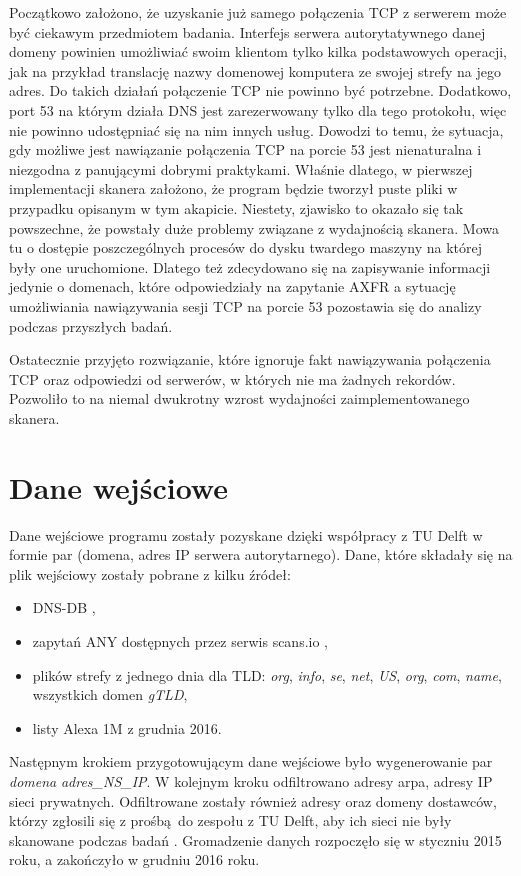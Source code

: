 Początkowo założono, że uzyskanie już samego połączenia TCP z serwerem może być ciekawym przedmiotem badania. Interfejs serwera
autorytatywnego danej domeny powinien umożliwiać swoim klientom tylko kilka podstawowych operacji, jak na przykład translację nazwy
domenowej komputera ze swojej strefy na jego adres. Do takich działań połączenie TCP nie powinno być potrzebne. Dodatkowo, port 53 na którym działa
DNS jest zarezerwowany tylko dla tego protokołu, więc nie powinno udostępniać się na nim innych usług. Dowodzi to temu, że sytuacja,
gdy możliwe jest nawiązanie połączenia TCP na porcie 53 jest nienaturalna i niezgodna z panującymi dobrymi praktykami. Właśnie dlatego,
w pierwszej implementacji skanera założono, że program będzie tworzył puste pliki w przypadku opisanym w tym akapicie. Niestety,
zjawisko to okazało się tak powszechne, że powstały duże problemy związane z wydajnością skanera. Mowa tu o dostępie poszczególnych
procesów do dysku twardego maszyny na której były one uruchomione. Dlatego też zdecydowano się na zapisywanie informacji jedynie o
domenach, które odpowiedziały na zapytanie AXFR a sytuację umożliwiania nawiązywania sesji TCP na porcie 53 pozostawia się do analizy
podczas przyszłych badań.

Ostatecznie przyjęto rozwiązanie, które ignoruje fakt nawiązywania połączenia TCP oraz odpowiedzi od serwerów, w których nie ma
żadnych rekordów. Pozwoliło to na niemal dwukrotny wzrost wydajności zaimplementowanego skanera.

\section{Dane wejściowe}
\label{inputData}
\noindent Dane wejściowe programu zostały pozyskane dzięki współpracy z TU Delft \cite{delft} w formie par (domena, adres IP serwera
autorytarnego). Dane, które składały się na plik wejściowy zostały pobrane z kilku źródeł:
\begin{itemize}
	\item DNS-DB \cite{DNSDB},
	\item zapytań ANY dostępnych przez serwis scans.io \cite{scansIOany},
	\item plików strefy z jednego dnia dla TLD: \textit{org}, \textit{info}, \textit{se}, \textit{net}, \textit{US}, \textit{org}, \textit{com},
	\textit{name}, wszystkich domen \textit{gTLD},
	\item listy Alexa 1M \cite{alexa} z grudnia 2016.
\end{itemize}
Następnym krokiem przygotowującym dane wejściowe było wygenerowanie par \textit{domena} \textit{adres\_NS\_IP}. W kolejnym kroku
odfiltrowano adresy arpa, adresy IP sieci prywatnych. Odfiltrowane zostały również adresy oraz domeny dostawców, którzy zgłosili się
z prośbą do zespołu z TU Delft, aby ich sieci nie były skanowane podczas badań \cite{maciek}.
Gromadzenie danych rozpoczęło się w styczniu 2015 roku, a zakończyło w grudniu 2016 roku.

